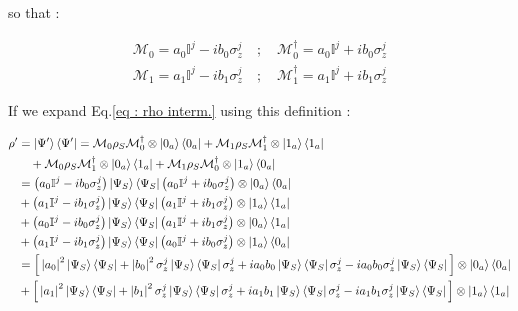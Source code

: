 \documentclass[a4paper,12pt]{article}
\begin{document}
	   so that : 
	   
	   \begin{align}
	   	\mathcal{M}_{0} = a_{0} \mathbb{I}^{j} -i b_{0} \sigma_{z}^{j} \quad ; \quad \mathcal{M}_{0}^{\dagger} = a_{0} \mathbb{I}^{j} + i b_{0} \sigma_{z}^{j} \\
	   	\mathcal{M}_{1} = a_{1} \mathbb{I}^{j} -i b_{1} \sigma_{z}^{j} \quad ; \quad \mathcal{M}_{1}^{\dagger} = a_{1} \mathbb{I}^{j} + i b_{1} \sigma_{z}^{j}
	   \end{align}
	   
	   If we expand Eq.\ref{eq : rho interm.} using this definition :
	   
	   \begin{align}
	   	\rho' &= \ket{\Psi'}\bra{\Psi'} = \mathcal{M}_{0} \rho_S \mathcal{M}_{0}^{\dagger} \otimes \ket{0_a}\bra{0_a} + \mathcal{M}_{1} \rho_S \mathcal{M}_{1}^{\dagger} \otimes \ket{1_a} \bra{1_a} \notag \\
	   	& \quad + \mathcal{M}_{0} \rho_S \mathcal{M}_{1}^{\dagger} \otimes \ket{0_a} \bra{1_a} + \mathcal{M}_{1} \rho_S \mathcal{M}_{0}^{\dagger} \otimes \ket{1_a} \bra{0_a} \notag \\
	   	& = \left(a_{0} \mathbb{I}^{j} - i b_{0} \sigma_{z}^{j}\right) \ket{\Psi_{S}}\bra{\Psi_{S}} \left(a_{0} \mathbb{I}^{j} + i b_{0} \sigma_{z}^{j}\right) \otimes \ket{0_{a}} \bra{0_{a}} \notag \\
	   	& + \left(a_{1} \mathbb{I}^{j} - i b_{1} \sigma_{z}^{j}\right) \ket{\Psi_{S}}\bra{\Psi_{S}} \left(a_{1} \mathbb{I}^{j} + i b_{1} \sigma_{z}^{j}\right) \otimes \ket{1_{a}} \bra{1_{a}} \notag \\
	   	& + \left(a_{0} \mathbb{I}^{j} - i b_{0} \sigma_{z}^{j}\right) \ket{\Psi_{S}}\bra{\Psi_{S}} \left(a_{1} \mathbb{I}^{j} + i b_{1} \sigma_{z}^{j}\right) \otimes \ket{0_{a}} \bra{1_{a}} \notag \\
	   	& + \left(a_{1} \mathbb{I}^{j} - i b_{1} \sigma_{z}^{j}\right) \ket{\Psi_{S}}\bra{\Psi_{S}} \left(a_{0} \mathbb{I}^{j} + i b_{0} \sigma_{z}^{j}\right) \otimes \ket{1_{a}} \bra{0_{a}} \notag \\
	   	& = \Big[ \left|a_{0}\right|^{2} \ket{\Psi_{S}}\bra{\Psi_{S}} + \left|b_{0}\right|^{2} \sigma_{z}^{j}\ket{\Psi_{S}}\bra{\Psi_{S}}\sigma_{z}^{j} + i a_{0}b_{0}\ket{\Psi_{S}}\bra{\Psi_{S}}\sigma_{z}^{j} -  i a_{0}b_{0} \sigma_{z}^{j} \ket{\Psi_{S}}\bra{\Psi_{S}} \Big] \otimes \ket{0_{a}} \bra{0_{a}} \notag \\
	   	& + \Big[ \left|a_{1}\right|^{2} \ket{\Psi_{S}}\bra{\Psi_{S}} + \left|b_{1}\right|^{2} \sigma_{z}^{j}\ket{\Psi_{S}}\bra{\Psi_{S}}\sigma_{z}^{j} + i a_{1}b_{1}\ket{\Psi_{S}}\bra{\Psi_{S}}\sigma_{z}^{j} -  i a_{1}b_{1} \sigma_{z}^{j} \ket{\Psi_{S}}\bra{\Psi_{S}} \Big] \otimes \ket{1_{a}} \bra{1_{a}} \notag \\

\end{align}
\end{document}

